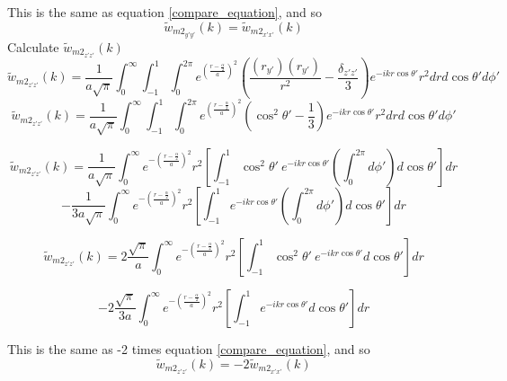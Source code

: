 \documentclass[double,12pt]{beavtex}
\begin{document}
This is the same as equation \ref{compare_equation}, and so \begin{equation}{\widetilde{w}_{{m2}_{y'y'}}(k)=\widetilde{w}_{{m2}_{x'x'}}(k)}\end{equation}
Calculate $\widetilde{w}_{{m2}_{z'z'}}(k)$ 
\begin{equation}{\widetilde{w}_{{m2}_{z'z'}}(k)=\frac{1}{a\sqrt{\pi}}\int_{0}^{\infty}\int_{-1}^{1}\int_{0}^{2\pi}e^{\left(\frac{r-\frac{\alpha}{2}}{a}\right)^2}\left(\frac{(r_{y'})(r_{y'})}{r^2}-\frac{\delta_{z'z'}}{3}\right)e^{-ikr\cos\theta'}r^2d{r}d{\cos\theta'}d{\phi'}}\end{equation}
\begin{equation}{\widetilde{w}_{{m2}_{z'z'}}(k)=\frac{1}{a\sqrt{\pi}}\int_{0}^{\infty}\int_{-1}^{1}\int_{0}^{2\pi}e^{\left(\frac{r-\frac{\alpha}{2}}{a}\right)^2}\left(\cos^2\theta'-\frac{1}{3}\right)e^{-ikr\cos\theta'}r^2d{r}d{\cos\theta'}d{\phi'}}\end{equation}

\begin{displaymath}{\widetilde{w}_{{m2}_{z'z'}}(k)=\frac{1}{a\sqrt{\pi}}\int_{0}^{\infty}e^{-\left(\frac{r-\frac{\alpha}{2}}{a}\right)^2}r^2\left[\int_{-1}^{1}\cos^2\theta'~e^{-ikr\cos\theta'}\left(\int_{0}^{2\pi}d{\phi'}\right)d{\cos\theta'}\right]d{r}}\end{displaymath} 
\begin{equation}{-\frac{1}{3a\sqrt{\pi}}\int_{0}^{\infty}e^{-\left(\frac{r-\frac{\alpha}{2}}{a}\right)^2}r^2\left[\int_{-1}^{1}e^{-ikr\cos\theta'}\left(\int_{0}^{2\pi}d{\phi'}\right)d{\cos\theta'}\right]d{r}}\end{equation}

\begin{displaymath}{\widetilde{w}_{{m2}_{z'z'}}(k)=2\frac{\sqrt{\pi}}{a}\int_{0}^{\infty}e^{-\left(\frac{r-\frac{\alpha}{2}}{a}\right)^2}r^2\left[\int_{-1}^{1}\cos^2\theta'~e^{-ikr\cos\theta'}d{\cos\theta'}\right]d{r}}\end{displaymath} 

\begin{equation}{-2\frac{\sqrt{\pi}}{3a}\int_{0}^{\infty}e^{-\left(\frac{r-\frac{\alpha}{2}}{a}\right)^2}r^2\left[\int_{-1}^{1}e^{-ikr\cos\theta'}d{\cos\theta'}\right]d{r}}\end{equation} 

This is the same as -2 times equation \ref{compare_equation}, and so \begin{equation}{\widetilde{w}_{{m2}_{z'z'}}(k)=-2\widetilde{w}_{{m2}_{x'x'}}(k)}\end{equation}
\end{document}
